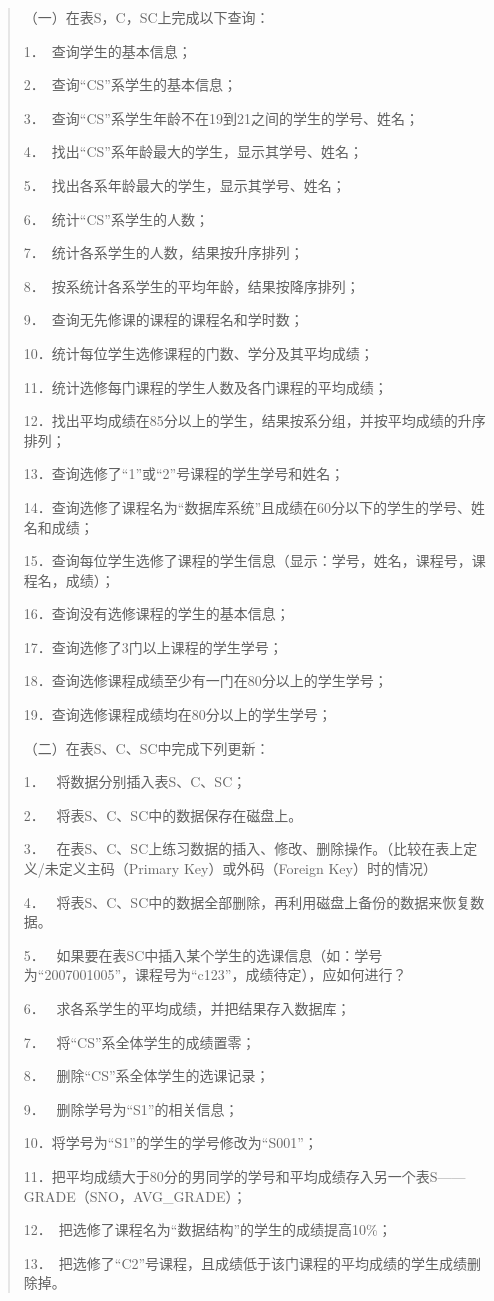 \documentclass[
]{article}
\begin{document}
\begin{quote}
（一）在表S，C，SC上完成以下查询：

1．~查询学生的基本信息；

2．~查询``CS''系学生的基本信息；

3．~查询``CS''系学生年龄不在19到21之间的学生的学号、姓名；

4．~找出``CS''系年龄最大的学生，显示其学号、姓名；

5．~找出各系年龄最大的学生，显示其学号、姓名；

6．~统计``CS''系学生的人数；

7．~统计各系学生的人数，结果按升序排列；

8．~按系统计各系学生的平均年龄，结果按降序排列；

9．~查询无先修课的课程的课程名和学时数；

10．统计每位学生选修课程的门数、学分及其平均成绩；

11．统计选修每门课程的学生人数及各门课程的平均成绩；

12．找出平均成绩在85分以上的学生，结果按系分组，并按平均成绩的升序排列；

13．查询选修了``1''或``2''号课程的学生学号和姓名；

14．查询选修了课程名为``数据库系统''且成绩在60分以下的学生的学号、姓名和成绩；

15．查询每位学生选修了课程的学生信息（显示：学号，姓名，课程号，课程名，成绩）；

16．查询没有选修课程的学生的基本信息；

17．查询选修了3门以上课程的学生学号；

18．查询选修课程成绩至少有一门在80分以上的学生学号；

19．查询选修课程成绩均在80分以上的学生学号；

（二）在表S、C、SC中完成下列更新：

1．~ 将数据分别插入表S、C、SC；

2．~ 将表S、C、SC中的数据保存在磁盘上。

3．~
在表S、C、SC上练习数据的插入、修改、删除操作。（比较在表上定义/未定义主码（Primary
Key）或外码（Foreign Key）时的情况）

4．~ 将表S、C、SC中的数据全部删除，再利用磁盘上备份的数据来恢复数据。

5．~
如果要在表SC中插入某个学生的选课信息（如：学号为``2007001005''，课程号为``c123''，成绩待定），应如何进行？

6．~ 求各系学生的平均成绩，并把结果存入数据库；

7．~ 将``CS''系全体学生的成绩置零；

8．~ 删除``CS''系全体学生的选课记录；

9．~ 删除学号为``S1''的相关信息；

10．将学号为``S1''的学生的学号修改为``S001''；

11．把平均成绩大于80分的男同学的学号和平均成绩存入另一个表S------GRADE（SNO，AVG\_GRADE）；

12．~把选修了课程名为``数据结构''的学生的成绩提高10\%；

13．~把选修了``C2''号课程，且成绩低于该门课程的平均成绩的学生成绩删除掉。
\end{quote}
\end{document}
